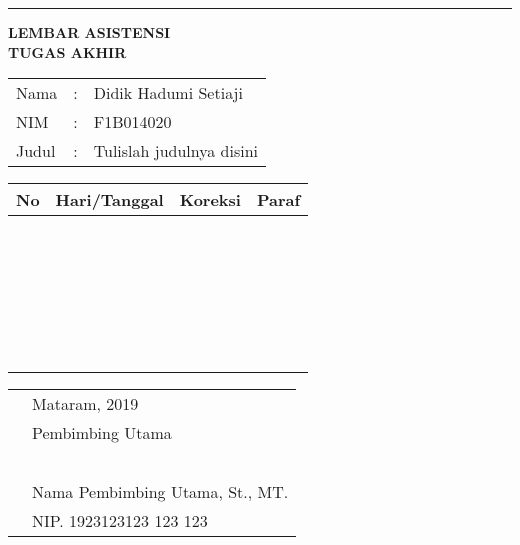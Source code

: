 \documentclass{report}
\begin{document}
\noindent\rule{\textwidth}{2pt}
\begin{center}
    \textbf{LEMBAR ASISTENSI\\
    TUGAS AKHIR}\\
\end{center}
\begin{tabularx}{\textwidth}{llX}
Nama & : & Didik Hadumi Setiaji \\
NIM & : & F1B014020 \\
Judul & : & Tulislah judulnya disini \\
\end{tabularx}
\begin{table}[H]
    \centering
    \begin{tabularx}{\textwidth}{
    | c %
    | >{\hsize=0.66\hsize }X %
    | >{\hsize=1.34\hsize }X %
    | p{2cm} %
    |}
    \hline
    \textbf{No} & \textbf{Hari/Tanggal} & \textbf{Koreksi} & \textbf{Paraf}\\
    \hline
     & & & \\
     & & & \\
     & & & \\
     & & & \\
     & & & \\
     & & & \\
     & & & \\
     & & & \\
     & & & \\
     & & & \\
     & & & \\
     & & & \\
     & & & \\
     & & & \\
     & & & \\
     & & & \\
     & & & \\
     & & & \\
     & & & \\
     & & & \\
     & & & \\
     & & & \\
     & & & \\
     & & & \\
     & & & \\
     & & & \\
     \hline
    \end{tabularx}
    \label{tab:my_label}
\end{table}
\begin{tabularx}{\textwidth}{XX}
& Mataram, \hspace{2cm} 2019 \\
& Pembimbing Utama \\ \\ \\ \\ \\ \\
& Nama Pembimbing Utama, St., MT. \\
& NIP. 1923123123 123 123
\end{tabularx}
\end{document}
